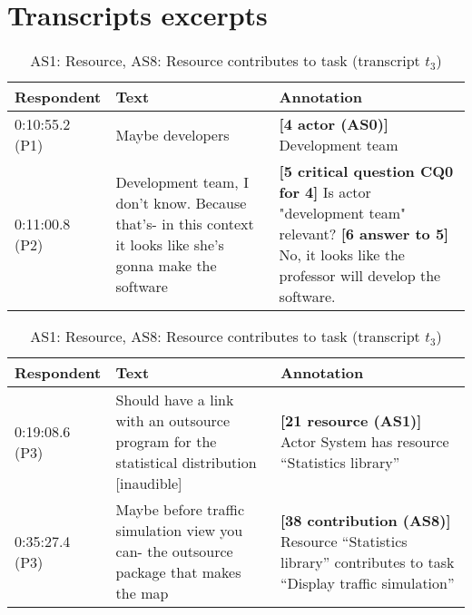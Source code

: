 \section{Transcripts excerpts}
\label{sect:transcripts:excerpts}

\begin{table}[!htbp]
\centering
\begin{tabular}{|p{20mm}|p{70mm}|p{60mm}|}
\hline
Respondent & Text & Annotation\\
\hline
0:10:55.2 (P1) & Maybe developers &\textbf{[4 actor (AS0)]} Development team\\
\hline
0:11:00.8 (P2) & Development team, I don't know. Because that's- in this context it looks like she's gonna make the software & \textbf{[5 critical question CQ0 for 4]} Is actor "development team" relevant?\newline
\textbf{[6 answer to 5]} No, it looks like the professor will develop the software.\\
\hline
\end{tabular}
\caption{AS0: Actor, CQ0: Relevant actor? (transcript $t_3$)}
\label{table:transcript:as0-cq0}

\begin{tabular}{|p{20mm}|p{70mm}|p{60mm}|}
\hline
Respondent & Text & Annotation\\
\hline
0:19:08.6 (P3) & Should have a link with an outsource program for the statistical distribution [inaudible] & \textbf{[21 resource (AS1)]} Actor System has resource ``Statistics library''\\
\hline
0:35:27.4 (P3) & Maybe before traffic simulation view you can- the outsource package that makes the map	& \textbf{[38 contribution (AS8)]} Resource ``Statistics library'' contributes to task ``Display traffic simulation''\\
\hline
\end{tabular}
\caption{AS1: Resource, AS8: Resource contributes to task (transcript $t_3$)}
\label{table:transcript:as1-as8}


\end{table}
